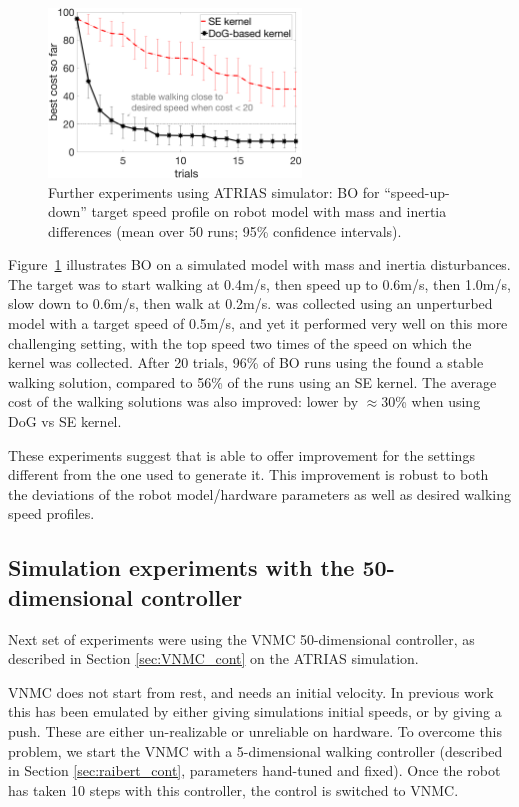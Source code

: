 \begin{figure}[t]
\centering
\includegraphics[width=0.6\textwidth]{img/sim_raibert_9d_speedupdown_disturbed_15.png}
\caption{\small{Further experiments using ATRIAS simulator: BO for ``speed-up-down'' target speed profile on robot model with mass and inertia differences
(mean over 50 runs; 95\% confidence intervals).}}
\label{fig:sim_9d_disturb}
\end{figure}

Figure~\ref{fig:sim_9d_disturb} illustrates BO on a simulated model with mass and inertia disturbances. The target was to start walking at 0.4m/s, then speed up to 0.6m/s, then 1.0m/s, slow down to 0.6m/s, then walk at 0.2m/s. \dogkernel was collected using an unperturbed model with a target speed of 0.5m/s, and yet it performed very well on this more challenging setting, with the top speed two times of the speed on which the kernel was collected. After 20 trials, 96\% of BO runs using the \dogkernel found a stable walking solution, compared to 56\% of the runs using an SE kernel. The average cost of the walking solutions was also improved: lower by $\approx$30\% when using DoG vs SE kernel.

These experiments suggest that \dogkernel is able to offer improvement for the settings different from the one used to generate it. This improvement is robust to both the deviations of the robot model/hardware parameters as well as desired walking speed profiles.

\subsection{Simulation experiments with the 50-dimensional controller}

\label{sec:vnmc_expt}
Next set of experiments were using the VNMC 50-dimensional controller, as described in Section \ref{sec:VNMC_cont} on the ATRIAS simulation.

VNMC does not start from rest, and needs an initial velocity. In previous work this has been emulated by either giving simulations initial speeds, or by giving a push. These are either un-realizable or unreliable on hardware. To overcome this problem, we start the VNMC with a \mbox{5-dimensional} walking controller (described in Section \ref{sec:raibert_cont}, parameters hand-tuned and fixed). Once the robot has taken 10 steps with this controller, the control is switched to VNMC. 

